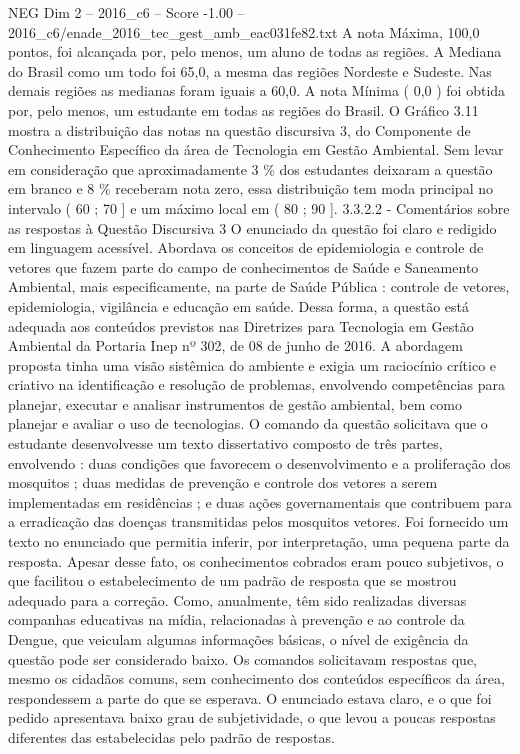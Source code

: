 \begin{textsample}{NEG Dim 2 – 2016\_c6 – Score -1.00 – 2016\_c6/enade\_2016\_tec\_gest\_amb\_eac031fe82.txt}
A nota Máxima, 100,0 pontos, foi alcançada por, pelo menos, um aluno de todas as regiões.
A Mediana do Brasil como um todo foi 65,0, a mesma das regiões Nordeste e Sudeste.
Nas demais regiões as medianas foram iguais a 60,0.
A nota Mínima ( 0,0 ) foi obtida por, pelo menos, um estudante em todas as regiões do Brasil.
O Gráfico 3.11 mostra a distribuição das notas na questão discursiva 3, do Componente de Conhecimento Específico da área de Tecnologia em Gestão Ambiental.
Sem levar em consideração que aproximadamente 3 \% dos estudantes deixaram a questão em branco e 8 \% receberam nota zero, essa distribuição tem moda principal no intervalo ( 60 ; 70 ] e um máximo local em ( 80 ; 90 ]. 3.3.2.2 - Comentários sobre as respostas à Questão Discursiva 3 O enunciado da questão foi claro e redigido em linguagem acessível.
Abordava os conceitos de epidemiologia e controle de vetores que fazem parte do campo de conhecimentos de Saúde e Saneamento Ambiental, mais especificamente, na parte de Saúde Pública : controle de vetores, epidemiologia, vigilância e educação em saúde.
Dessa forma, a questão está adequada aos conteúdos previstos nas Diretrizes para Tecnologia em Gestão Ambiental da Portaria Inep nº 302, de 08 de junho de 2016.
A abordagem proposta tinha uma visão sistêmica do ambiente e exigia um raciocínio crítico e criativo na identificação e resolução de problemas, envolvendo competências para planejar, executar e analisar instrumentos de gestão ambiental, bem como planejar e avaliar o uso de tecnologias.
O comando da questão solicitava que o estudante desenvolvesse um texto dissertativo composto de três partes, envolvendo : duas condições que favorecem o desenvolvimento e a proliferação dos mosquitos ; duas medidas de prevenção e controle dos vetores a serem implementadas em residências ; e duas ações governamentais que contribuem para a erradicação das doenças transmitidas pelos mosquitos vetores.
Foi fornecido um texto no enunciado que permitia inferir, por interpretação, uma pequena parte da resposta.
Apesar desse fato, os conhecimentos cobrados eram pouco subjetivos, o que facilitou o estabelecimento de um padrão de resposta que se mostrou adequado para a correção.
Como, anualmente, têm sido realizadas diversas companhas educativas na mídia, relacionadas à prevenção e ao controle da Dengue, que veiculam algumas informações básicas, o nível de exigência da questão pode ser considerado baixo.
Os comandos solicitavam respostas que, mesmo os cidadãos comuns, sem conhecimento dos conteúdos específicos da área, respondessem a parte do que se esperava.
O enunciado estava claro, e o que foi pedido apresentava baixo grau de subjetividade, o que levou a poucas respostas diferentes das estabelecidas pelo padrão de respostas.

\end{textsample}
